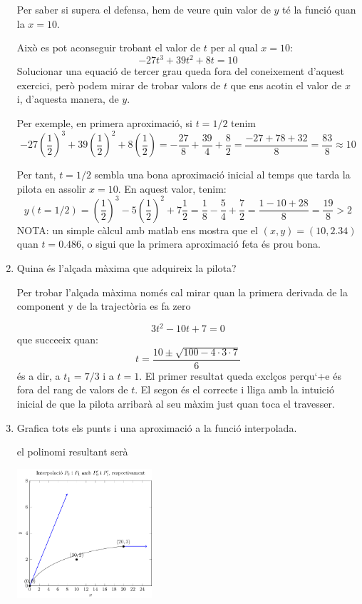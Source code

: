 \begin{enumerate}
Per saber si supera el defensa, hem de veure quin valor de $y$ té la funció quan la $x=10$.

Això es pot aconseguir trobant el valor de $t$ per al qual $x=10$:
\[-27 t^3 +39 t^2 +8t=10\]
Solucionar una equació de tercer grau queda fora del coneixement d'aquest exercici, però podem mirar de trobar valors de $t$ que ens acotin el valor de $x$ i, d'aquesta manera, de $y$.

Per exemple, en primera aproximació, si $t=1/2$ tenim
\[-27 \left(\frac{1}{2}\right)^3 +39  \left(\frac{1}{2}\right)^2 +8\left(\frac{1}{2}\right)=-\frac{27}{8}+\frac{39}{4}+\frac{8}{2}=\frac{-27+78+32}{8}=\frac{83}{8}\approx 10\]

Per tant, $t=1/2$ sembla una bona aproximació inicial al temps que tarda la pilota en assolir $x=10$. En aquest valor, tenim:
\[
  y(t=1/2)=\left(\frac{1}{2}\right)^3-5\left(\frac{1}{2}\right)^2+7\frac{1}{2}=\frac{1}{8}-\frac{5}{4}+\frac{7}{2}=\frac{1-10+28}{8}=\frac{19}{8}>2
\]
NOTA: un simple càlcul amb matlab ens mostra que el $(x,y)=(10,2.34)$ quan $t=0.486$, o sigui que la primera aproximació feta és prou bona.

  \item Quina és l'alçada màxima que adquireix la pilota?

  Per trobar l'alçada màxima només cal mirar quan la primera derivada de la component y de la trajectòria es fa zero

  \[
    3t^2-10t+7=0\]
    que succeeix quan: 
    \[
      t=\frac{10 \pm \sqrt{100-4\cdot 3\cdot 7}}{6}\]
    és a dir, a $t_1=7/3$ i a $t=1$. El primer resultat queda exclços perqu`+e és fora del rang de valors de $t$. El segon és el correcte i lliga amb la intuició inicial de que la pilota arribarà al seu màxim just quan toca el travesser. 

  \item Grafica tots els punts i una aproximació a la funció interpolada.
  
  el polinomi resultant serà

\begin{center}
  \includegraphics[width=5cm]{../figures/interpolaciohermite2final.pdf}
\end{center}
\end{enumerate}
